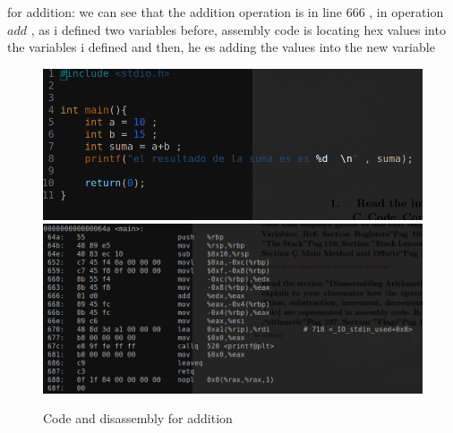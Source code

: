 \documentclass[10pt,a4paper]{article} %
\begin{document}
        for addition:
        we can see that the addition operation is in line $ 666  $  , in
        operation $ add  $  , as i defined two variables before, assembly code
        is locating hex values into the variables i defined and then, he es
        adding the values into the new variable
        \begin{figure}[h!]
            \centering
            \includegraphics[width=1\linewidth]{codeforsum.png}
            \includegraphics[width=1\linewidth]{sumadis.png}
            \caption{Code and disassembly for addition}
            \label{adfig}
        \end{figure}
\end{document}
